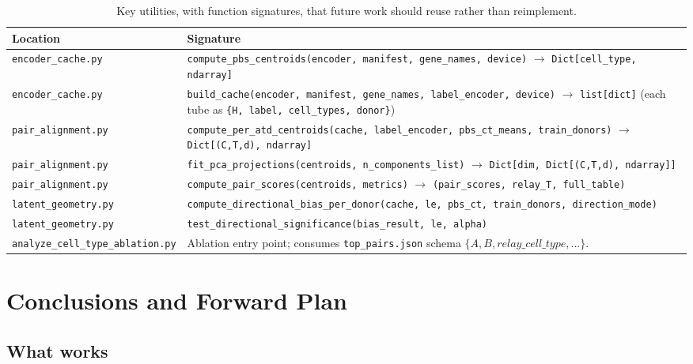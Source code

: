 \documentclass[11pt,a4paper]{article}
\newcommand{\codeword}[1]{\texttt{\small #1}}
\begin{document}
\begin{table}[h]
\centering
\caption{Key utilities, with function signatures, that future work
should reuse rather than reimplement.}
\label{tab:utilities}
\footnotesize
\begin{tabular}{p{5cm}p{10cm}}
\toprule
\textbf{Location} & \textbf{Signature} \\
\midrule
\codeword{encoder\_cache.py} &
\codeword{compute\_pbs\_centroids(encoder, manifest, gene\_names, device)}
$\to$ \codeword{Dict[cell\_type, ndarray]} \\
\codeword{encoder\_cache.py} &
\codeword{build\_cache(encoder, manifest, gene\_names, label\_encoder, device)}
$\to$ \codeword{list[dict]} (each tube as \codeword{\{H, label, cell\_types, donor\}}) \\
\codeword{pair\_alignment.py} &
\codeword{compute\_per\_atd\_centroids(cache, label\_encoder, pbs\_ct\_means, train\_donors)}
$\to$ \codeword{Dict[(C,T,d), ndarray]} \\
\codeword{pair\_alignment.py} &
\codeword{fit\_pca\_projections(centroids, n\_components\_list)}
$\to$ \codeword{Dict[dim, Dict[(C,T,d), ndarray]]} \\
\codeword{pair\_alignment.py} &
\codeword{compute\_pair\_scores(centroids, metrics)}
$\to$ \codeword{(pair\_scores, relay\_T, full\_table)} \\
\codeword{latent\_geometry.py} &
\codeword{compute\_directional\_bias\_per\_donor(cache, le, pbs\_ct, train\_donors, direction\_mode)} \\
\codeword{latent\_geometry.py} &
\codeword{test\_directional\_significance(bias\_result, le, alpha)} \\
\codeword{analyze\_cell\_type\_ablation.py} &
Ablation entry point; consumes \codeword{top\_pairs.json} schema $\{A, B, relay\_cell\_type, \ldots\}$. \\
\bottomrule
\end{tabular}
\end{table}

\section{Conclusions and Forward Plan}

\subsection{What works}
\end{document}
